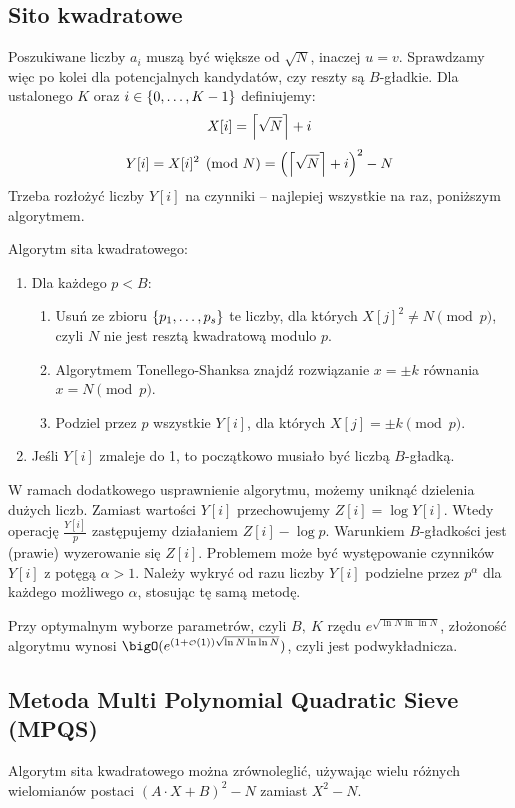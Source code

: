 \subsection{Sito kwadratowe}
Poszukiwane liczby \( a_i \) muszą być większe od \( \sqrt{N} \), inaczej \( u = v \). Sprawdzamy więc po kolei dla potencjalnych kandydatów, czy reszty są \( B \)-gładkie.
Dla ustalonego \( K \) oraz \( i \in \set{0, \dots, K-1} \) definiujemy:
\[ X[i] = \left\lceil\sqrt{N}\right\rceil + i \]
\[ Y[i] = X[i]^2 \pmod{N} = \left(\left\lceil\sqrt{N}\right\rceil + i\right)^2 - N \]
Trzeba rozłożyć liczby \( Y[i] \) na czynniki -- najlepiej wszystkie na raz, poniższym algorytmem.
\begin{greyframe}
	Algorytm sita kwadratowego:
	\begin{enumerate}
		\item Dla każdego \( p < B \):
		      \begin{enumerate}
			      \item Usuń ze zbioru \( \set{p_1, \dots, p_s} \) te liczby, dla których \( X[j]^2 \neq N \pmod{p} \), \\ czyli \( N \) nie jest resztą kwadratową modulo \( p \).
			      \item Algorytmem Tonellego-Shanksa znajdź rozwiązanie \( x = \pm k \) równania \\ \( x = N \pmod{p} \).
			      \item Podziel przez \( p \) wszystkie \( Y[i] \), dla których \( X[j] = \pm k \pmod{p} \).
		      \end{enumerate}
		\item Jeśli \( Y[i] \) zmaleje do 1, to początkowo musiało być liczbą \( B \)-gładką.
	\end{enumerate}
\end{greyframe}
W ramach dodatkowego usprawnienie algorytmu, możemy uniknąć dzielenia dużych liczb. Zamiast wartości \( Y[i] \) przechowujemy \( Z[i] = \log Y[i] \).
Wtedy operację \( \frac{Y[i]}{p} \) zastępujemy działaniem \( Z[i] - \log p \). Warunkiem \( B \)-gładkości jest (prawie) wyzerowanie się \( Z[i] \).
Problemem może być występowanie czynników \( Y[i] \) z potęgą \( \alpha > 1 \). Należy wykryć od razu liczby \( Y[i] \) podzielne przez \( p^{\alpha} \) dla każdego możliwego \( \alpha \), stosując tę samą metodę.

Przy optymalnym wyborze parametrów, czyli \( B, \ K \) rzędu \( e^{\sqrt{\ln N \ln\ln N}} \), złożoność algorytmu wynosi \( \bigO(e^{(1 + {\scriptscriptstyle\mathcal{O}}(1))\sqrt{\ln N \ln\ln N}}) \), czyli jest podwykładnicza.

\subsection{Metoda Multi Polynomial Quadratic Sieve (MPQS)}
Algorytm sita kwadratowego można zrównoleglić, używając wielu różnych wielomianów postaci \( (A \cdot X + B)^2 - N \) zamiast \( X^2 - N \).
